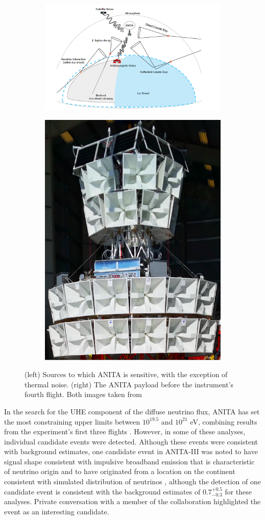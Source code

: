\begin{figure}
\centering
\begin{subfigure}
  \centering
  \includegraphics[width=.65\linewidth]{figures/ANITA/ANITA_signals.png}
  \label{fig:ANITA_cartoon}
\end{subfigure}%
\begin{subfigure}
  \centering
  \includegraphics[width=.3\linewidth]{figures/ANITA/ANITA_detector.png}
  \label{fig:ANITA_detector}
\end{subfigure}
\caption[ANITA detector schematic]{(left) Sources to which ANITA is sensitive, with the exception of thermal noise. (right) The ANITA payload before the instrument's fourth flight. Both images taken from \cite{Ludwig:2019}}
\label{fig:ANITA_instrument}
\end{figure}

In the search for the UHE component of the diffuse neutrino flux, ANITA has set the most constraining upper limits between $10^{19.5}$ and $10^{21}$ eV, combining results from the experiment's first three flights \cite{Gorham:2008yk, Gorham:2010kv, Allison:2018cxu}. However, in some of these analyses, individual candidate events were detected. Although these events were consistent with background estimates, one candidate event in ANITA-III was noted to have signal shape consistent with impulsive broadband emission that is characteristic of neutrino origin and to have originated from a location on the continent consistent with simulated distribution of neutrinos \cite{Allison:2018cxu}, although the detection of one candidate event is consistent with the background estimates of $0.7^{+0.5}_{-0.3}$ for these analyses. Private conversation with a member of the collaboration highlighted the event as an interesting candidate. 

